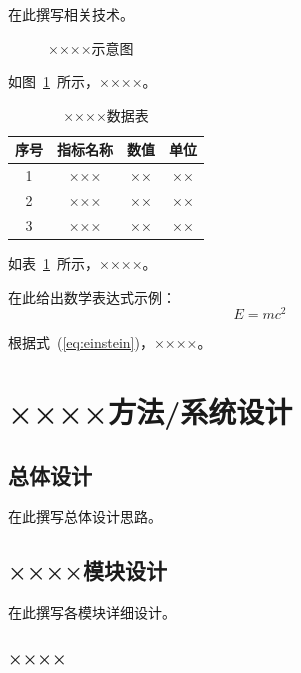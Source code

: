 \documentclass[12pt, a4paper, openany]{ltjbook}
\begin{document}
在此撰写相关技术。

\begin{figure}[htbp]
  \centering
  \caption{××××示意图}
  \label{fig:example}
\end{figure}

如图~\ref{fig:example}~所示，××××。

\begin{table}[htbp]
  \centering
  \caption{××××数据表}
  \label{tab:example}
  \begin{tabular}{cccc}
    \toprule
    序号 & 指标名称 & 数值 & 单位 \\
    \midrule
    1 & ××× & ×× & ×× \\
    2 & ××× & ×× & ×× \\
    3 & ××× & ×× & ×× \\
    \bottomrule
  \end{tabular}
\end{table}

如表~\ref{tab:example}~所示，××××。

在此给出数学表达式示例：
\begin{equation}
  E = mc^2
  \label{eq:einstein}
\end{equation}

根据式~(\ref{eq:einstein})，××××。

\chapter{××××方法/系统设计}

\section{总体设计}

在此撰写总体设计思路。

\section{××××模块设计}

在此撰写各模块详细设计。

\subsection{××××}
\end{document}
